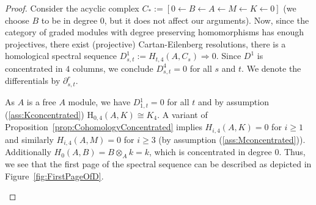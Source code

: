 \documentclass[10pt,a4paper]{amsart}
\newcommand{\rmH}{\mathrm{H}}
\begin{document}
\begin{proof}
    Consider the acyclic complex $C_*:=[0\leftarrow B\leftarrow A \leftarrow M\leftarrow K\leftarrow 0]$ (we choose $B$ to be in degree $0$, but it does not affect our arguments). Now, since the category of graded modules with degree preserving homomorphisms has enough projectives, there exist (projective) Cartan-Eilenberg resolutions, there is a homological spectral sequence $D^1_{s,t}:=H_{t,4}(A,C_s)\Rightarrow 0$. Since $D^1$ is concentrated in $4$ columns, we conclude $D^4_{s,t}=0$ for all $s$ and $t$. We denote the differentials by $\partial^r_{s,t}$.

    As $A$ is a free $A$ module, we have ${D}{^1_{1,t}}=0$ for all $t$ and by assumption (\ref{ass:Kconcentrated}) $\rmH_{0,4}(A,K)\cong K_4$. A variant of Proposition~\ref{prop:CohomologyConcentrated} implies $H_{i,4}(A,K)=0$ for $i\geq 1$ and similarly $H_{i,4}(A,M)=0$ for $i\geq 3$ (by assumption (\ref{ass:Mconcentrated})). Additionally $H_0(A,B)=B\otimes_Ak=k$, which is concentrated in degree $0$. Thus, we see that the first page of the spectral sequence can be described as depicted in Figure~\ref{fig:FirstPageOfD}.

    \begin{figure}[ht]
        \centering
\end{figure}
\end{proof}
\end{document}
